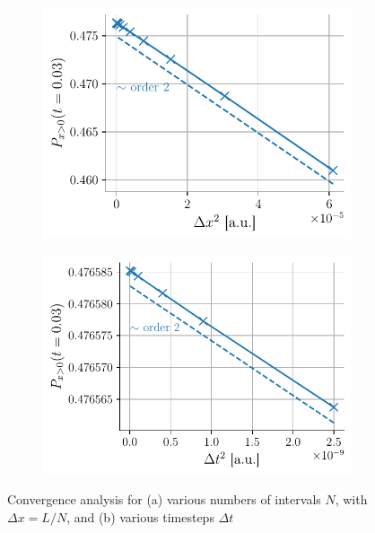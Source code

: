 \begin{figure}[h]
    \centering
    \begin{subfigure}{0.48\linewidth}
        \includegraphics[width=\linewidth]{figures/conv_dx.pdf}
        \caption{}
        \label{fig:conv-dx}
    \end{subfigure}
    \begin{subfigure}{0.48\linewidth}
        \includegraphics[width=\linewidth]{figures/conv_dt.pdf}
        \caption{}
        \label{fig:conv-dt}
    \end{subfigure}
    \caption{Convergence analysis for (a) various numbers of intervals $N$, with $\Delta x = L/N$, and (b) various timesteps $\Delta t$}
    \label{fig:convs}
\end{figure}

